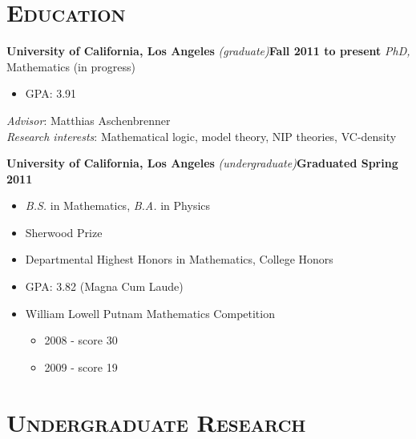 \documentclass[margin, 10pt]{res} %
\begin{document}
\begin{resume}


\section{\textsc{Education}}

\textbf{University of California, Los Angeles} {\sl (graduate)}\hfill \textbf{Fall 2011 to present}
{\sl PhD,} Mathematics (in progress)

\begin{itemize}
	\item GPA: 3.91
\end{itemize}

{\sl Advisor}: Matthias Aschenbrenner \\
{\sl Research interests}: Mathematical logic, model theory, NIP theories, VC-density

\textbf{University of California, Los Angeles} {\sl (undergraduate)}\hfill \textbf{Graduated Spring 2011}

\begin{itemize}
	\item {\sl B.S.} in Mathematics, {\sl B.A.} in Physics
	\item Sherwood Prize
	\item Departmental Highest Honors in Mathematics, College Honors
	\item GPA: 3.82 (Magna Cum Laude)
	\item William Lowell Putnam Mathematics Competition
		\begin{itemize}
			\item 2008 - score 30
			\item 2009 - score 19
		\end{itemize}
\end{itemize}


 
\section{\textsc{Undergraduate Research}}


\end{resume}
\end{document}
